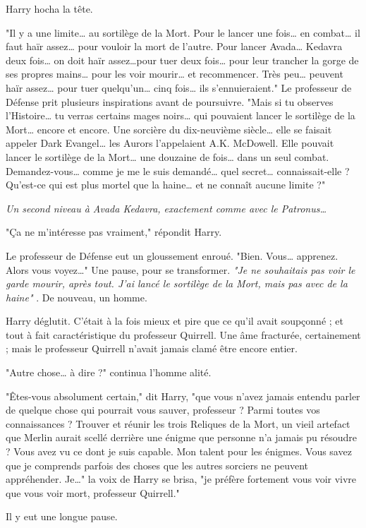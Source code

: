 Harry hocha la tête.

"Il y a une limite… au sortilège de la Mort. Pour le lancer une fois… en combat… il faut haïr assez… pour vouloir la mort de l'autre. Pour lancer Avada… Kedavra deux fois… on doit haïr assez…pour tuer deux fois… pour leur trancher la gorge de ses propres mains… pour les voir mourir… et recommencer. Très peu… peuvent haïr assez… pour tuer quelqu'un… cinq fois… ils s'ennuieraient." Le professeur de Défense prit plusieurs inspirations avant de poursuivre. "Mais si tu observes l'Histoire… tu verras certains mages noirs… qui pouvaient lancer le sortilège de la Mort… encore et encore. Une sorcière du dix-neuvième siècle… elle se faisait appeler Dark Evangel… les Aurors l'appelaient A.K. McDowell. Elle pouvait lancer le sortilège de la Mort… une douzaine de fois… dans un seul combat. Demandez-vous… comme je me le suis demandé… quel secret… connaissait-elle ? Qu'est-ce qui est plus mortel que la haine… et ne connaît aucune limite ?"

\emph{Un second niveau à Avada Kedavra, exactement comme avec le Patronus…} 

"Ça ne m'intéresse pas vraiment," répondit Harry.

Le professeur de Défense eut un gloussement enroué. "Bien. Vous… apprenez. Alors vous voyez…" Une pause, pour se transformer. \emph{"Je ne souhaitais pas voir le garde mourir, après tout. J'ai lancé le sortilège de la Mort, mais pas avec de la haine"} . De nouveau, un homme.

Harry déglutit. C'était à la fois mieux et pire que ce qu'il avait soupçonné ; et tout à fait caractéristique du professeur Quirrell. Une âme fracturée, certainement ; mais le professeur Quirrell n'avait jamais clamé être encore entier.

"Autre chose… à dire ?" continua l'homme alité.

"Êtes-vous absolument certain," dit Harry, "que vous n'avez jamais entendu parler de quelque chose qui pourrait vous sauver, professeur ? Parmi toutes vos connaissances ? Trouver et réunir les trois Reliques de la Mort, un vieil artefact que Merlin aurait scellé derrière une énigme que personne n'a jamais pu résoudre ? Vous avez vu ce dont je suis capable. Mon talent pour les énigmes. Vous savez que je comprends parfois des choses que les autres sorciers ne peuvent appréhender. Je…" la voix de Harry se brisa, "je préfère fortement vous voir vivre que vous voir mort, professeur Quirrell."

Il y eut une longue pause.

